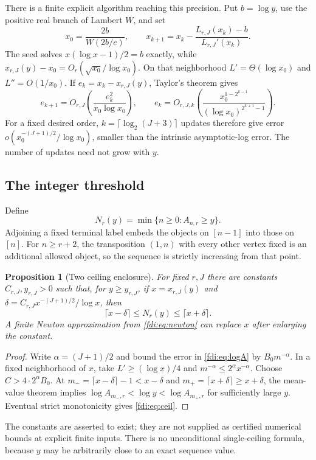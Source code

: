 \documentclass[11pt,letterpaper]{article}
\newtheorem{proposition}[theorem]{Proposition}
\theoremstyle{remark}\newtheorem{remark}[theorem]{Remark}
\begin{document}
There is a finite explicit algorithm reaching this precision. Put $b=\log y$, use the positive real branch of Lambert $W$, and set
\begin{equation}\label{fdi:eq:newton}
 x_0=\frac{2b}{W(2b/e)},\qquad
 x_{k+1}=x_k-\frac{L_{r,J}(x_k)-b}{L_{r,J}'(x_k)}.
\end{equation}
The seed solves $x(\log x-1)/2=b$ exactly, while
$x_{r,J}(y)-x_0=O_r(\sqrt{x_0}/\log x_0)$.
On that neighborhood $L'=\Theta(\log x_0)$ and $L''=O(1/x_0)$. If $e_k=x_k-x_{r,J}(y)$, Taylor's theorem gives
\[
 e_{k+1}=O_{r,J}\!\left(\frac{e_k^2}{x_0\log x_0}\right),\qquad
 e_k=O_{r,J,k}\!\left(
 \frac{x_0^{1-2^{k-1}}}{(\log x_0)^{2^{k+1}-1}}\right).
\]
For a fixed desired order, $k=\lceil\log_2(J+3)\rceil$ updates therefore give error
$o(x_0^{-(J+1)/2}/\log x_0)$, smaller than the intrinsic asymptotic-log error. The number of updates need not grow with $y$.

\subsection{The integer threshold}
Define
\[
 N_r(y)=\min\{n\ge0:A_{n,r}\ge y\}.
\]
Adjoining a fixed terminal label embeds the objects on $[n-1]$ into those on $[n]$. For $n\ge r+2$, the transposition $(1,n)$ with every other vertex fixed is an additional allowed object, so the sequence is strictly increasing from that point.

\begin{proposition}[Two ceiling enclosure]\label{fdi:prop:ceil}
For fixed $r,J$ there are constants $C_{r,J},y_{r,J}>0$ such that, for $y\ge y_{r,J}$, if $x=x_{r,J}(y)$ and
$\delta=C_{r,J}x^{-(J+1)/2}/\log x$, then
\begin{equation}\label{fdi:eq:ceil}
 \lceil x-\delta\rceil\le N_r(y)\le\lceil x+\delta\rceil.
\end{equation}
A finite Newton approximation from \eqref{fdi:eq:newton} can replace $x$ after enlarging the constant.
\end{proposition}
\begin{proof}
Write $\alpha=(J+1)/2$ and bound the error in \eqref{fdi:eq:logA} by $B_0m^{-\alpha}$. In a fixed neighborhood of $x$, take $L'\ge(\log x)/4$ and $m^{-\alpha}\le2^\alpha x^{-\alpha}$. Choose $C>4\cdot2^\alpha B_0$. At
$m_- =\lceil x-\delta\rceil-1<x-\delta$ and
$m_+=\lceil x+\delta\rceil\ge x+\delta$,
the mean-value theorem implies
$\log A_{m_-,r}<\log y<\log A_{m_+,r}$ for sufficiently large $y$. Eventual strict monotonicity gives \eqref{fdi:eq:ceil}.
\end{proof}
The constants are asserted to exist; they are not supplied as certified numerical bounds at explicit finite inputs. There is no unconditional single-ceiling formula, because $y$ may be arbitrarily close to an exact sequence value.
\end{document}

